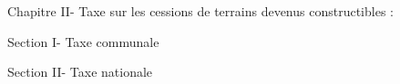 Chapitre II- Taxe sur les cessions de terrains devenus constructibles :

		Section I- Taxe communale 

		Section II- Taxe nationale
